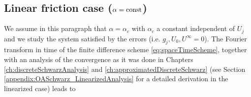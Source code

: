 \subsection{Linear friction case ($\alpha = {\rm const}$)}
%
%
We assume in this paragraph that $\alpha=\alpha_{c}$ with $\alpha_{c}$ 
a constant independent of $U_j$ and we study the system satisfied by the errors
(i.e. $g_j, U_0, U^\infty =0$). 
The Fourier transform in time of the finite difference scheme
\eqref{eq:spaceTimeScheme}, together with an analysis
of the convergence as it was done in
Chapters \ref{ch:discreteSchwarzAnalysis} and
\ref{ch:approximatedDiscreteSchwarz}
(see Section \ref{appendix:OASchwarz_LinearizedAnalysis}
for a detailed derivation in the linearized case) leads to 
